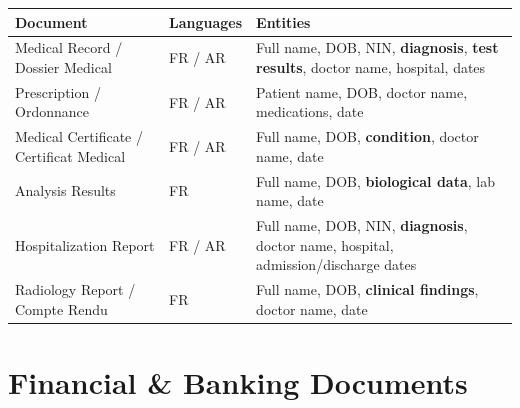 \documentclass[11pt,a4paper]{article}
\begin{document}
\begin{longtable}{|p{4cm}|p{2.5cm}|p{9cm}|}
\hline
\textbf{Document} & \textbf{Languages} & \textbf{Entities} \\
\hline
\endhead

Medical Record / Dossier Medical
&
FR / AR
&
Full name, DOB, NIN, \textbf{\textcolor{catIII}{diagnosis}}, \textbf{\textcolor{catIII}{test results}}, doctor name, hospital, dates
\\ \hline

Prescription / Ordonnance
&
FR / AR
&
Patient name, DOB, doctor name, medications, date
\\ \hline

Medical Certificate / Certificat Medical
&
FR / AR
&
Full name, DOB, \textbf{\textcolor{catIII}{condition}}, doctor name, date
\\ \hline

Analysis Results
&
FR
&
Full name, DOB, \textbf{\textcolor{catIII}{biological data}}, lab name, date
\\ \hline

Hospitalization Report
&
FR / AR
&
Full name, DOB, NIN, \textbf{\textcolor{catIII}{diagnosis}}, doctor name, hospital, admission/discharge dates
\\ \hline

Radiology Report / Compte Rendu
&
FR
&
Full name, DOB, \textbf{\textcolor{catIII}{clinical findings}}, doctor name, date
\\ \hline

\end{longtable}

\section{Financial \& Banking Documents}
\end{document}

